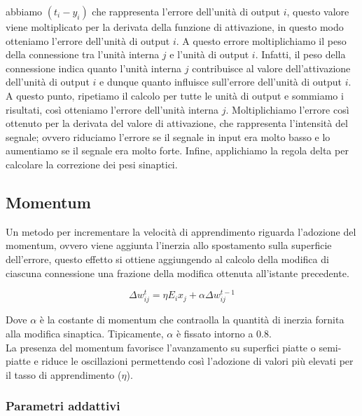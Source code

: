 abbiamo $(t_i - y_i)$ che rappresenta l'errore dell'unità di output $i$, questo
valore viene moltiplicato per la derivata della funzione di attivazione, in
questo modo otteniamo l'errore dell'unità di output $i$. A questo errore
moltiplichiamo il peso della connessione tra l'unità interna $j$ e l'unità di
output $i$. Infatti, il peso della connessione indica quanto l'unità interna
$j$ contribuisce al valore dell'attivazione dell'unità di output $i$ e dunque
quanto influisce sull'errore dell'unità di output $i$. A questo punto, ripetiamo
il calcolo per tutte le unità di output e sommiamo i risultati, così otteniamo
l'errore dell'unità interna $j$. Moltiplichiamo l'errore così ottenuto per la
derivata del valore di attivazione, che rappresenta l'intensità del segnale;
ovvero riduciamo l'errore se il segnale in input era molto basso e lo aumentiamo
se il segnale era molto forte. Infine, applichiamo la regola delta per calcolare
la correzione dei pesi sinaptici.
\subsection{Momentum}

Un metodo per incrementare la velocità di apprendimento riguarda l'adozione del
momentum, ovvero viene aggiunta l'inerzia allo spostamento sulla superficie
dell'errore, questo effetto si ottiene aggiungendo al calcolo della modifica di
ciascuna connessione una frazione della modifica ottenuta all'istante
precedente.

\begin{equation}
	\Delta w^t_{ij} = \eta E_i x_j + \alpha \Delta w^{t-1}_{ij}
\end{equation}

Dove $\alpha$ è la costante di momentum che contraolla la quantità di inerzia
fornita alla modifica sinaptica. Tipicamente, $\alpha$ è fissato intorno a
$0.8$.\\
La presenza del momentum favorisce l'avanzamento su superfici piatte o
semi-piatte e riduce le oscillazioni permettendo così l'adozione di valori più
elevati per il tasso di apprendimento ($\eta$).

\subsubsection{Parametri addattivi}

